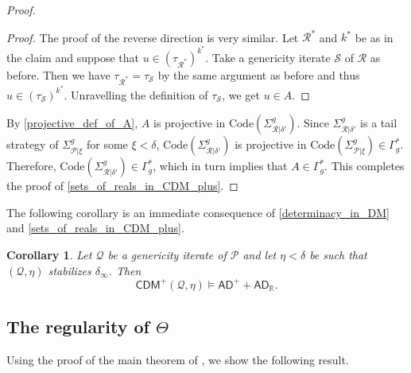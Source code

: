 \documentclass{amsart}
\newtheorem{cor}[dfn]{Corollary}
\begin{document}
\begin{proof}
\begin{proof}
The proof of the reverse direction is very similar.
Let $\mathcal{R}^*$ and $k^*$ be as in the claim and suppose that $u\in(\tau_{\mathcal{R}^*})^{k^*}$.
Take a genericity iterate $\mathcal{S}$ of $\mathcal{R}$ as before.
Then we have $\tau_{\mathcal{R}^*}=\tau_{\mathcal{S}}$ by the same argument as before and thus $u\in(\tau_{\mathcal{S}})^{k^*}$.
Unravelling the definition of $\tau_{\mathcal{S}}$, we get $u\in A$.
\end{proof}

By \cref{projective_def_of_A}, $A$ is projective in $\mathrm{Code}(\Sigma^g_{\mathcal{R}\vert\delta'})$.
Since $\Sigma^g_{\mathcal{R}\vert\delta'}$ is a tail strategy of $\Sigma^g_{\mathcal{P}\vert\xi}$ for some $\xi<\delta$, $\mathrm{Code}(\Sigma^g_{\mathcal{R}\vert\delta'})$ is projective in $\mathrm{Code}(\Sigma^g_{\mathcal{P}\vert\xi})\in\Gamma^*_g$.
Therefore, $\mathrm{Code}(\Sigma^g_{\mathcal{R}\vert\delta'})\in\Gamma^*_g$, which in turn implies that $A\in\Gamma^*_g$.
This completes the proof of \cref{sets_of_reals_in_CDM_plus}.
\end{proof}

The following corollary is an immediate consequence of \cref{determinacy_in_DM} and \cref{sets_of_reals_in_CDM_plus}.

\begin{cor}\label{determinacy_in_CDM_plus_1}
Let $\mathcal{Q}$ be a genericity iterate of $\mathcal{P}$ and 
let $\eta<\delta$ be such that $(\mathcal{Q}, \eta)$ stabilizes $\delta_{\infty}$.
Then
\[\mathsf{CDM}^{+}(\mathcal{Q}, \eta)\models\mathsf{AD}^{+}+\mathsf{AD}_{\mathbb{R}}.
\]
\end{cor}

\subsection{The regularity of $\Theta$}

Using the proof of the main theorem of \cite{dm_of_self_it}, we show the following result.
\end{document}
